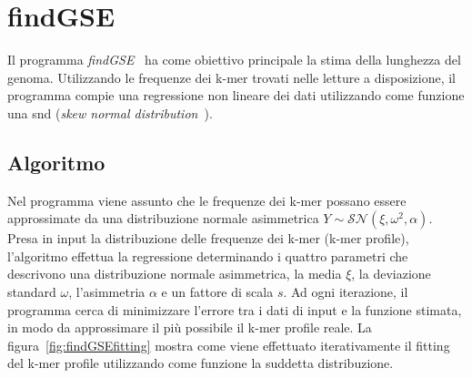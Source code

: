 \documentclass[crop=false, class=book]{standalone}
\begin{document}
	\section{findGSE}
	\label{sec:findGSE}
	Il programma \textit{findGSE}~\cite{sun2017findGSE} ha come obiettivo principale la stima della lunghezza del genoma. Utilizzando le frequenze dei k-mer trovati nelle letture a disposizione, il programma compie una regressione non lineare dei dati utilizzando come funzione una \gls{snd} (\textit{skew normal distribution}~\cite{azzalini1985class,azzalini2005skew}).
	
	\subsection{Algoritmo}
	Nel programma viene assunto che le frequenze dei k-mer possano essere approssimate da una distribuzione normale asimmetrica $Y \sim \mathcal{SN}(\xi, \omega^2, \alpha)$. Presa in input la distribuzione delle frequenze dei k-mer (k-mer profile), l'algoritmo effettua la regressione determinando i quattro parametri che descrivono una distribuzione normale asimmetrica, la media $\xi$, la deviazione standard $\omega$, l'asimmetria $\alpha$ e un fattore di scala $s$. Ad ogni iterazione, il programma cerca di minimizzare l'errore tra i dati di input e la funzione stimata, in modo da approssimare il più possibile il k-mer profile reale. La figura~\vref{fig:findGSEfitting} mostra come viene effettuato iterativamente il fitting del k-mer profile utilizzando come funzione la suddetta distribuzione.
	
\end{document}
